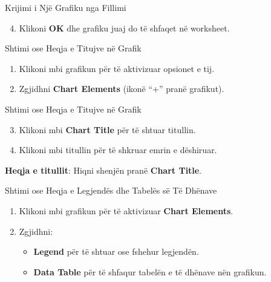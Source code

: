 \documentclass[
  ignorenonframetext,
]{beamer}
\providecommand{\tightlist}{%
  \setlength{\itemsep}{0pt}\setlength{\parskip}{0pt}}
\begin{document}
\begin{frame}{Krijimi i Një Grafiku nga Fillimi}
\label{krijimi-i-njuxeb-grafiku-nga-fillimi-2}
\begin{enumerate}
\setcounter{enumi}{3}
\tightlist
\item
  Klikoni \textbf{OK} dhe grafiku juaj do të shfaqet në worksheet.
\end{enumerate}
\end{frame}

\begin{frame}{Shtimi ose Heqja e Titujve në Grafik}
\label{shtimi-ose-heqja-e-titujve-nuxeb-grafik}
\begin{enumerate}
\item
  Klikoni mbi grafikun për të aktivizuar opsionet e tij.
\item
  Zgjidhni \textbf{Chart Elements} (ikonë ``+'' pranë grafikut).
\end{enumerate}
\end{frame}

\begin{frame}{Shtimi ose Heqja e Titujve në Grafik}
\label{shtimi-ose-heqja-e-titujve-nuxeb-grafik-1}
\begin{enumerate}
\setcounter{enumi}{2}
\item
  Klikoni mbi \textbf{Chart Title} për të shtuar titullin.
\item
  Klikoni mbi titullin për të shkruar emrin e dëshiruar.
\end{enumerate}

\textbf{Heqja e titullit}: Hiqni shenjën pranë \textbf{Chart Title}.
\end{frame}

\begin{frame}{Shtimi ose Heqja e Legjendës dhe Tabelës së Të Dhënave}
\label{shtimi-ose-heqja-e-legjenduxebs-dhe-tabeluxebs-suxeb-tuxeb-dhuxebnave}
\begin{enumerate}
\item
  Klikoni mbi grafikun për të aktivizuar \textbf{Chart Elements}.
\item
  Zgjidhni:

  \begin{itemize}
  \item
    \textbf{Legend} për të shtuar ose fshehur legjendën.
  \item
    \textbf{Data Table} për të shfaqur tabelën e të dhënave nën
    grafikun.
  \end{itemize}
\end{enumerate}
\end{frame}
\end{document}
